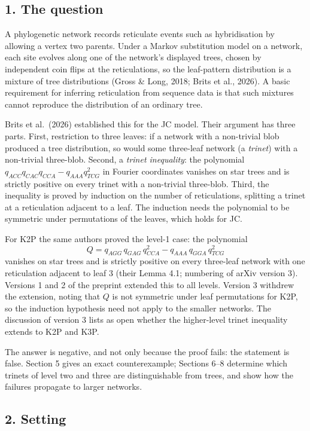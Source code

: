 \documentclass[
  11pt,
]{article}
\begin{document}
\subsection{1. The question}\label{the-question}

A phylogenetic network records reticulate events such as hybridisation
by allowing a vertex two parents. Under a Markov substitution model on a
network, each site evolves along one of the network's displayed trees,
chosen by independent coin flips at the reticulations, so the
leaf-pattern distribution is a mixture of tree distributions (Gross \&
Long, 2018; Brits et al., 2026). A basic requirement for inferring
reticulation from sequence data is that such mixtures cannot reproduce
the distribution of an ordinary tree.

Brits et al.~(2026) established this for the JC model. Their argument
has three parts. First, restriction to three leaves: if a network with a
non-trivial blob produced a tree distribution, so would some three-leaf
network (a \emph{trinet}) with a non-trivial three-blob. Second, a
\emph{trinet inequality}: the polynomial
\(q_{ACC}q_{CAC}q_{CCA} - q_{AAA}q_{TCG}^2\) in Fourier coordinates
vanishes on star trees and is strictly positive on every trinet with a
non-trivial three-blob. Third, the inequality is proved by induction on
the number of reticulations, splitting a trinet at a reticulation
adjacent to a leaf. The induction needs the polynomial to be symmetric
under permutations of the leaves, which holds for JC.

For K2P the same authors proved the level-1 case: the polynomial
\[Q = q_{AGG}\,q_{GAG}\,q_{CCA}^2 - q_{AAA}\,q_{GGA}\,q_{TCG}^2\]
vanishes on star trees and is strictly positive on every three-leaf
network with one reticulation adjacent to leaf 3 (their Lemma 4.1;
numbering of arXiv version 3). Versions 1 and 2 of the preprint extended
this to all levels. Version 3 withdrew the extension, noting that \(Q\)
is not symmetric under leaf permutations for K2P, so the induction
hypothesis need not apply to the smaller networks. The discussion of
version 3 lists as open whether the higher-level trinet inequality
extends to K2P and K3P.

The answer is negative, and not only because the proof fails: the
statement is false. Section 5 gives an exact counterexample; Sections
6--8 determine which trinets of level two and three are distinguishable
from trees, and show how the failures propagate to larger networks.

\subsection{2. Setting}\label{setting}
\end{document}
